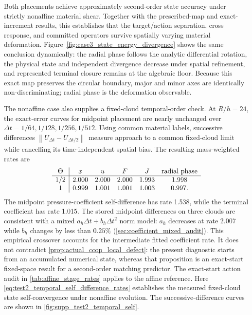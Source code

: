 \documentclass[11pt]{article}
\theoremstyle{plain}
\theoremstyle{definition}
\theoremstyle{remark}
\newcommand{\dt}{\Delta t}
\newcommand{\Th}{\Theta}
\newcommand{\norm}[2][]{\left\lVert #2\right\rVert_{#1}}
\begin{document}
Both placements achieve approximately second-order state accuracy under
strictly nonaffine material shear.  Together with the prescribed-map and
exact-increment results, this establishes that the target/action separation,
cross response, and committed operators survive spatially varying material
deformation.  Figure~\ref{fig:case3_state_energy_divergence} shows the same
conclusion dynamically: the radial phase follows the analytic differential
rotation, the physical state and independent divergence decrease under spatial
refinement, and represented terminal closure remains at the algebraic floor.
Because this exact map preserves the circular boundary, major and minor axes
are identically non-discriminating; radial phase is the deformation observable.

The nonaffine case also supplies a fixed-cloud temporal-order check.  At
$R/h=24$, the exact-error curves for midpoint placement are nearly unchanged
over $\dt=1/64,1/128,1/256,1/512$.  Using common material labels, successive
differences $\norm{U_{\dt}-U_{\dt/2}}$ measure approach to a common
fixed-cloud limit while cancelling its time-independent spatial bias.
The resulting
mass-weighted rates are
\begin{equation}
\begin{array}{c|ccccc}
\Th & x & u & F & J & \hbox{radial phase}\\ \hline
1/2 & 2.000 & 2.000 & 2.000 & 1.993 & 1.998\\
1   & 0.999 & 1.001 & 1.001 & 1.003 & 0.997.
\end{array}
\label{eq:test2_temporal_self_difference_rates}
\end{equation}
The midpoint pressure-coefficient self-difference has rate 1.538, while the
terminal coefficient has rate 1.015.  The stored midpoint differences on
three clouds are consistent with a mixed $a_h\dt+b_h\dt^2$ norm model:
$a_h$ decreases at rate 2.007 while $b_h$ changes by less than $0.25\%$
(\cref{sec:coefficient_mixed_audit}).  This empirical crossover accounts for
the intermediate fitted coefficient rate.  It does not contradict
\cref{prop:actual_ccop_local_defect}: the present diagnostic starts from an
accumulated numerical state, whereas that proposition is an exact-start
fixed-space result for a second-order matching predictor.
The exact-start action audit in \cref{tab:affine_stage_rates} applies to the
affine reference.  Here
\eqref{eq:test2_temporal_self_difference_rates} establishes the measured
fixed-cloud state self-convergence under nonaffine evolution.
The successive-difference curves are shown in
\cref{fig:supp_test2_temporal_self}.
\end{document}
